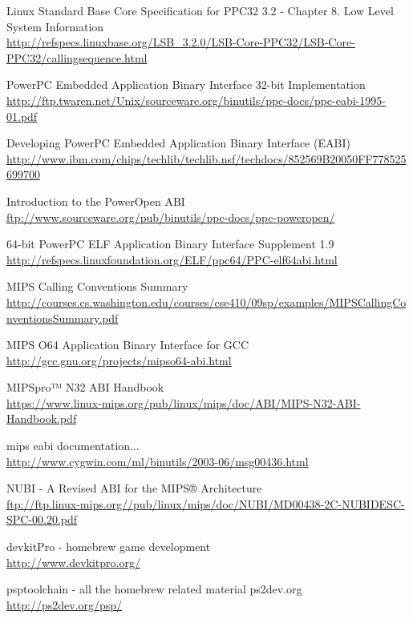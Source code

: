 \begin{thebibliography}{99}
	Linux Standard Base Core Specification for PPC32 3.2 - Chapter 8. Low Level System Information\\
	\url{http://refspecs.linuxbase.org/LSB\_3.2.0/LSB-Core-PPC32/LSB-Core-PPC32/callingsequence.html}

	PowerPC Embedded Application Binary Interface 32-bit Implementation\\
	\url{http://ftp.twaren.net/Unix/sourceware.org/binutils/ppc-docs/ppc-eabi-1995-01.pdf}

	Developing PowerPC Embedded Application Binary Interface (EABI)\\
	\url{http://www.ibm.com/chips/techlib/techlib.nsf/techdocs/852569B20050FF778525699700}

	Introduction to the PowerOpen ABI\\
	\url{ftp://www.sourceware.org/pub/binutils/ppc-docs/ppc-poweropen/}

	64-bit PowerPC ELF Application Binary Interface Supplement 1.9\\
	\url{http://refspecs.linuxfoundation.org/ELF/ppc64/PPC-elf64abi.html}

	MIPS Calling Conventions Summary\\
	\url{http://courses.cs.washington.edu/courses/cse410/09sp/examples/MIPSCallingConventionsSummary.pdf}

	MIPS O64 Application Binary Interface for GCC\\
	\url{http://gcc.gnu.org/projects/mipso64-abi.html}

	MIPSpro™ N32 ABI Handbook\\
	\url{https://www.linux-mips.org/pub/linux/mips/doc/ABI/MIPS-N32-ABI-Handbook.pdf}

	mips eabi documentation...\\
	\url{http://www.cygwin.com/ml/binutils/2003-06/msg00436.html}

	NUBI - A Revised ABI for the MIPS® Architecture\\
	\url{ftp://ftp.linux-mips.org//pub/linux/mips/doc/NUBI/MD00438-2C-NUBIDESC-SPC-00.20.pdf}

	devkitPro - homebrew game development\\
	\url{http://www.devkitpro.org/}

	psptoolchain - all the homebrew related material ps2dev.org\\
	\url{http://ps2dev.org/psp/}


\end{thebibliography}

